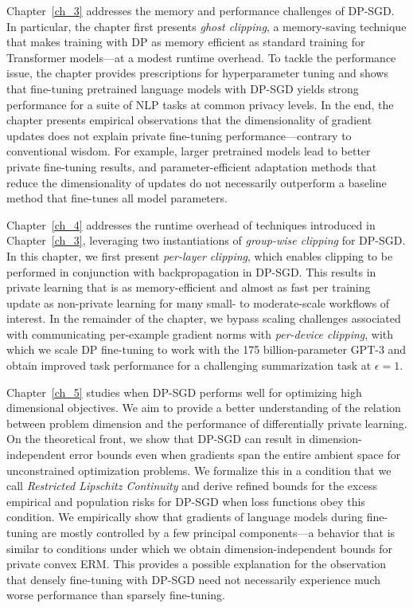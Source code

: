 Chapter~\ref{ch_3} addresses the memory and performance challenges of DP-SGD.
In particular, the chapter first presents \emph{ghost clipping}, a memory-saving technique that makes training with DP as memory efficient as standard training for Transformer models---at a modest runtime overhead.
To tackle the performance issue, the chapter provides prescriptions for hyperparameter tuning and shows that fine-tuning pretrained language models with DP-SGD yields strong performance for a suite of NLP tasks at common privacy levels.
In the end, the chapter presents empirical observations that the dimensionality of gradient updates does not explain private fine-tuning performance---contrary to conventional wisdom.
For example, larger pretrained models lead to better private fine-tuning results, and parameter-efficient adaptation methods that reduce the dimensionality of updates do not necessarily outperform a baseline method that fine-tunes all model parameters.

Chapter~\ref{ch_4} addresses the runtime overhead of techniques introduced in Chapter~\ref{ch_3}, leveraging
two instantiations of \emph{group-wise clipping} for DP-SGD.
In this chapter, we first present \emph{per-layer clipping}, which enables clipping to be performed in conjunction with backpropagation in
DP-SGD. 
This results in private learning that is as memory-efficient and almost as fast per training update as non-private learning for many small- to moderate-scale workflows of interest.
In the remainder of the chapter, we bypass scaling challenges associated with communicating per-example gradient norms with \emph{per-device clipping}, with which we scale DP fine-tuning to work with the 175 billion-parameter GPT-3 and obtain improved task performance for a challenging summarization task at $\epsilon=1$.


Chapter~\ref{ch_5} studies when DP-SGD performs well for optimizing high dimensional objectives. 
We aim to provide a better understanding of the relation between problem dimension and the performance of differentially private learning.
On the theoretical front, we show that DP-SGD can result in dimension-independent error bounds even when gradients span the entire ambient space for unconstrained optimization problems.
We formalize this in a condition that we call \emph{Restricted Lipschitz Continuity} and derive refined bounds for the excess empirical and population risks for DP-SGD when loss functions obey this condition.
We empirically show that gradients of language models during fine-tuning are mostly
controlled by a few principal components---a behavior that is similar to conditions under which we
obtain dimension-independent bounds for private convex ERM. This provides a possible explanation
for the observation that densely fine-tuning with DP-SGD need not necessarily experience much
worse performance than sparsely fine-tuning.

